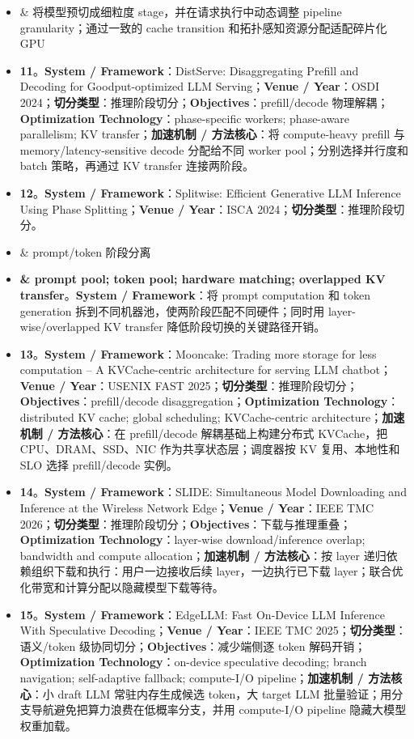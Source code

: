 \documentclass[a4paper,twocolumn,10pt]{ctexart}
\begin{document}
\begin{itemize}
\item \& 将模型预切成细粒度 stage，并在请求执行中动态调整 pipeline granularity；通过一致的 cache transition 和拓扑感知资源分配适配碎片化 GPU
\item \textbf{11}。\textbf{System / Framework}：DistServe: Disaggregating Prefill and Decoding for Goodput-optimized LLM Serving；\textbf{Venue / Year}：OSDI 2024；\textbf{切分类型}：推理阶段切分；\textbf{Objectives}：prefill/decode 物理解耦；\textbf{Optimization Technology}：phase-specific workers; phase-aware parallelism; KV transfer；\textbf{加速机制 / 方法核心}：将 compute-heavy prefill 与 memory/latency-sensitive decode 分配给不同 worker pool；分别选择并行度和 batch 策略，再通过 KV transfer 连接两阶段。
\item \textbf{12}。\textbf{System / Framework}：Splitwise: Efficient Generative LLM Inference Using Phase Splitting；\textbf{Venue / Year}：ISCA 2024；\textbf{切分类型}：推理阶段切分。
\item \& prompt/token 阶段分离
\item \textbf{\& prompt pool; token pool; hardware matching; overlapped KV transfer}。\textbf{System / Framework}：将 prompt computation 和 token generation 拆到不同机器池，使两阶段匹配不同硬件；同时用 layer-wise/overlapped KV transfer 降低阶段切换的关键路径开销。
\item \textbf{13}。\textbf{System / Framework}：Mooncake: Trading more storage for less computation -- A KVCache-centric architecture for serving LLM chatbot；\textbf{Venue / Year}：USENIX FAST 2025；\textbf{切分类型}：推理阶段切分；\textbf{Objectives}：prefill/decode disaggregation；\textbf{Optimization Technology}：distributed KV cache; global scheduling; KVCache-centric architecture；\textbf{加速机制 / 方法核心}：在 prefill/decode 解耦基础上构建分布式 KVCache，把 CPU、DRAM、SSD、NIC 作为共享状态层；调度器按 KV 复用、本地性和 SLO 选择 prefill/decode 实例。
\item \textbf{14}。\textbf{System / Framework}：SLIDE: Simultaneous Model Downloading and Inference at the Wireless Network Edge；\textbf{Venue / Year}：IEEE TMC 2026；\textbf{切分类型}：推理阶段切分；\textbf{Objectives}：下载与推理重叠；\textbf{Optimization Technology}：layer-wise download/inference overlap; bandwidth and compute allocation；\textbf{加速机制 / 方法核心}：按 layer 递归依赖组织下载和执行：用户一边接收后续 layer，一边执行已下载 layer；联合优化带宽和计算分配以隐藏模型下载等待。
\item \textbf{15}。\textbf{System / Framework}：EdgeLLM: Fast On-Device LLM Inference With Speculative Decoding；\textbf{Venue / Year}：IEEE TMC 2025；\textbf{切分类型}：语义/token 级协同切分；\textbf{Objectives}：减少端侧逐 token 解码开销；\textbf{Optimization Technology}：on-device speculative decoding; branch navigation; self-adaptive fallback; compute-I/O pipeline；\textbf{加速机制 / 方法核心}：小 draft LLM 常驻内存生成候选 token，大 target LLM 批量验证；用分支导航避免把算力浪费在低概率分支，并用 compute-I/O pipeline 隐藏大模型权重加载。

\end{itemize}
\end{document}
